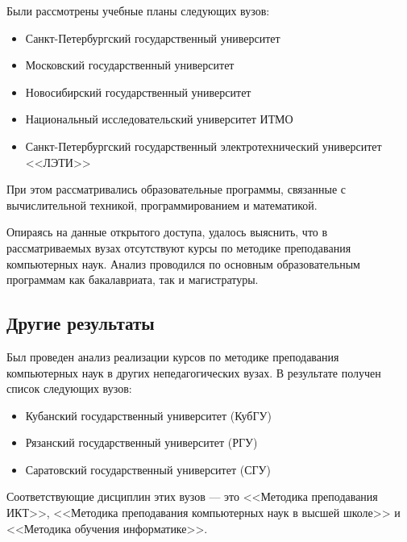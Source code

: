 \documentclass{math-mech-sci}
\begin{document}
Были рассмотрены учебные планы следующих вузов:
\begin{itemize}
 \item Санкт-Петербургский государственный университет
 \item Московский государственный университет 
 \item Новосибирский государственный университет 
 \item Национальный исследовательский университет ИТМО 
 \item Санкт-Петербургский государственный электротехнический университет <<ЛЭТИ>> 
\end{itemize}
При этом рассматривались образовательные программы, связанные с вычислительной техникой, программированием и математикой.

Опираясь на данные открытого доступа, удалось выяснить, что в рассматриваемых вузах отсутствуют курсы по методике преподавания компьютерных наук.
Анализ проводился по основным образовательным программам как бакалавриата, так и магистратуры.


\subsection{Другие результаты}

Был проведен анализ реализации курсов по методике преподавания компьютерных наук в других непедагогических вузах.
В результате получен список следующих вузов:

\begin{itemize}
\item Кубанский государственный университет (КубГУ)
\item Рязанский государственный университет (РГУ)
\item Саратовский государственный университет (СГУ)
\end{itemize}
Соответствующие дисциплин этих вузов --- это <<Методика преподавания ИКТ>>, <<Методика преподавания компьютерных наук в высшей школе>> и <<Методика обучения информатике>>. 
\end{document}
